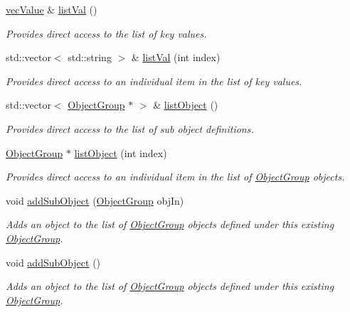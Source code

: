 \begin{DoxyCompactItemize}
\hyperlink{namespaceosea_ae7c5f2bab0fab3931b2ef51a0ad04cc2}{vec\-Value} \& \hyperlink{classosea_1_1_object_group_a6c3064de310a852551d438a5f31f987f}{list\-Val} ()
\begin{DoxyCompactList}\small\item\em Provides direct access to the list of key values. \end{DoxyCompactList}\item 
std\-::vector$<$ std\-::string $>$ \& \hyperlink{classosea_1_1_object_group_af23637baa7d1b46b34dcb5e5de4b68bd}{list\-Val} (int index)
\begin{DoxyCompactList}\small\item\em Provides direct access to an individual item in the list of key values. \end{DoxyCompactList}\item 
std\-::vector$<$ \hyperlink{classosea_1_1_object_group}{Object\-Group} $\ast$ $>$ \& \hyperlink{classosea_1_1_object_group_a13cd6186adf626bf61b279f1f6f75790}{list\-Object} ()
\begin{DoxyCompactList}\small\item\em Provides direct access to the list of sub object definitions. \end{DoxyCompactList}\item 
\hyperlink{classosea_1_1_object_group}{Object\-Group} $\ast$ \hyperlink{classosea_1_1_object_group_a0a080e78f85ad74d3920d8d4d2896ff4}{list\-Object} (int index)
\begin{DoxyCompactList}\small\item\em Provides direct access to an individual item in the list of \hyperlink{classosea_1_1_object_group}{Object\-Group} objects. \end{DoxyCompactList}\item 
void \hyperlink{classosea_1_1_object_group_ab705c0409d674106c28518368e5108ad}{add\-Sub\-Object} (\hyperlink{classosea_1_1_object_group}{Object\-Group} obj\-In)
\begin{DoxyCompactList}\small\item\em Adds an object to the list of \hyperlink{classosea_1_1_object_group}{Object\-Group} objects defined under this existing \hyperlink{classosea_1_1_object_group}{Object\-Group}. \end{DoxyCompactList}\item 
void \hyperlink{classosea_1_1_object_group_a71804670b83abe0c161f5fdebc598373}{add\-Sub\-Object} ()
\begin{DoxyCompactList}\small\item\em Adds an object to the list of \hyperlink{classosea_1_1_object_group}{Object\-Group} objects defined under this existing \hyperlink{classosea_1_1_object_group}{Object\-Group}. \end{DoxyCompactList}\item 

\end{DoxyCompactItemize}
